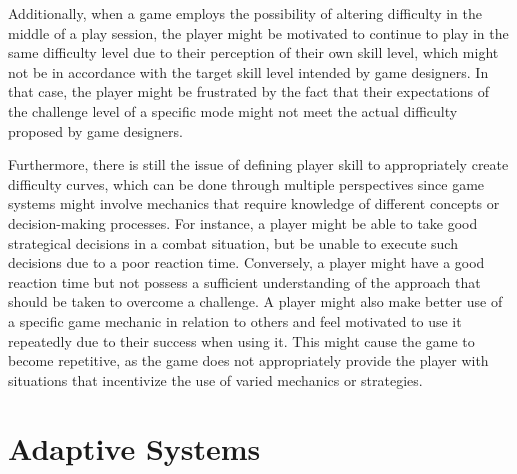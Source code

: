 Additionally, when a game employs the possibility of altering difficulty in the middle of a play session, the player might be motivated to continue to play in the same difficulty level due to their perception of their own skill level, which might not be in accordance with the target skill level intended by game designers. In that case, the player might be frustrated by the fact that their expectations of the challenge level of a specific mode might not meet the actual difficulty proposed by game designers.

Furthermore, there is still the issue of defining player skill to appropriately create difficulty curves, which can be done through multiple perspectives since game systems might involve mechanics that require knowledge of different concepts or decision-making processes. For instance, a player might be able to take good strategical decisions in a combat situation, but be unable to execute such decisions due to a poor reaction time. Conversely, a player might have a good reaction time but not possess a sufficient understanding of the approach that should be taken to overcome a challenge. A player might also make better use of a specific game mechanic in relation to others and feel motivated to use it repeatedly due to their success when using it. This might cause the game to become repetitive, as the game does not appropriately provide the player with situations that incentivize the use of varied mechanics or strategies.


\section{Adaptive Systems}

